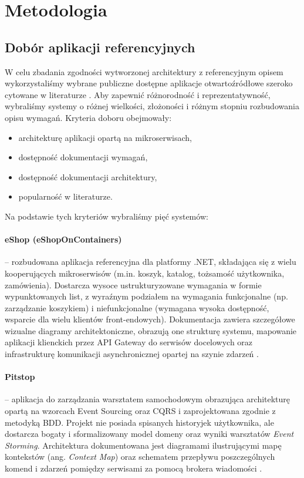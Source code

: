 \section{Metodologia}

\subsection{Dobór aplikacji referencyjnych}

W celu zbadania zgodności wytworzonej architektury z referencyjnym opisem wykorzystaliśmy wybrane publiczne dostępne aplikacje otwartoźródłowe szeroko cytowane w literaturze \cite{imranur_curated_2019, slater_quantitative_2025}. Aby zapewnić różnorodność i reprezentatywność, wybraliśmy systemy o różnej wielkości, złożoności i różnym stopniu rozbudowania opisu wymagań. Kryteria doboru obejmowały:

\begin{itemize}
	\item architekturę aplikacji opartą na mikroserwisach,
	\item dostępność dokumentacji wymagań,
	\item dostępność dokumentacji architektury,
	\item popularność w literaturze.
\end{itemize}

Na podstawie tych kryteriów wybraliśmy pięć systemów:

\paragraph{eShop (eShopOnContainers)} -- rozbudowana aplikacja referencyjna dla platformy .NET, składająca się z wielu kooperujących mikroserwisów (m.in. koszyk, katalog, tożsamość użytkownika, zamówienia). Dostarcza wysoce ustrukturyzowane wymagania w formie wypunktowanych list, z wyraźnym podziałem na wymagania funkcjonalne (np. zarządzanie koszykiem) i niefunkcjonalne (wymagana wysoka dostępność, wsparcie dla wielu klientów front-endowych). Dokumentacja zawiera szczegółowe wizualne diagramy architektoniczne, obrazują one strukturę systemu, mapowanie aplikacji klienckich przez API Gateway do serwisów docelowych oraz infrastrukturę komunikacji asynchronicznej opartej na szynie zdarzeń \cite{noauthor_dotneteshop_2026}.

\paragraph{Pitstop} -- aplikacja do zarządzania warsztatem samochodowym obrazująca architekturę opartą na wzorcach Event Sourcing oraz CQRS i zaprojektowana zgodnie z metodyką BDD. Projekt nie posiada spisanych historyjek użytkownika, ale dostarcza bogaty i sformalizowany model domeny oraz wyniki warsztatów \textit{Event Storming}. Architektura dokumentowana jest diagramami ilustrującymi mapę kontekstów (ang. \textit{Context Map}) oraz schematem przepływu poszczególnych komend i zdarzeń pomiędzy serwisami za pomocą brokera wiadomości \cite{wijk_edwinvwpitstop_2026}.

